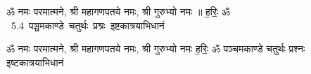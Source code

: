 \documentclass[17pt]{extarticle}
\begin{document}
\begin{titlepage}
    \begin{center}
 
\begin{sanskrit}
    { \Large
    ॐ नमः परमात्मने, श्री महागणपतये नमः, श्री गुरुभ्यो नमः ॥ ह॒रिः॒ ॐ 
    }
    \\
    \vspace{2.5cm}
    \mbox{ \Huge
    5.4      पञ्चमकाण्डे चतुर्थः प्रश्नः इष्टकात्रयाभिधानं   }
\end{sanskrit}
\end{center}

\end{titlepage}
\tableofcontents

ॐ नमः परमात्मने, श्री महागणपतये नमः, श्री गुरुभ्यो नमः
ह॒रिः॒ ॐ       पञ्चमकाण्डे चतुर्थः प्रश्नः इष्टकात्रयाभिधानं \newline

\end{document}
